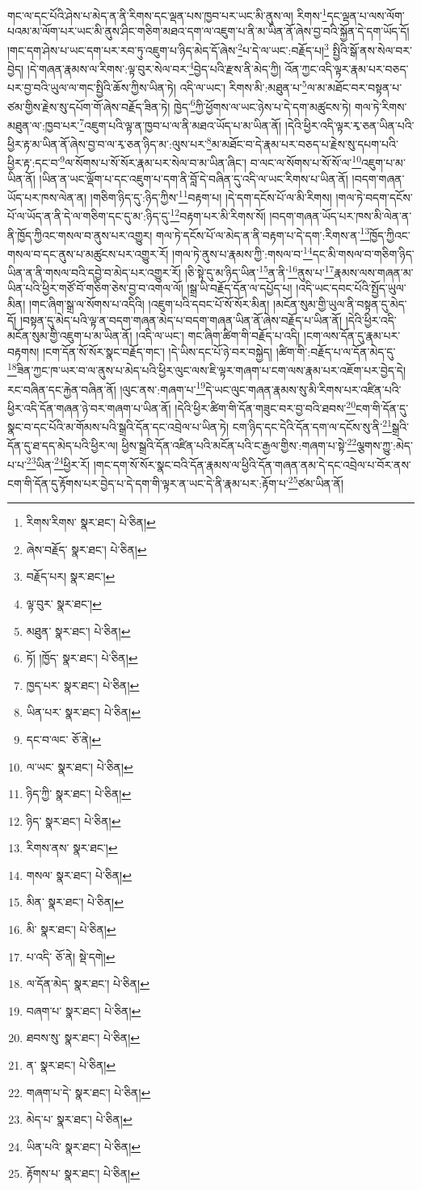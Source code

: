 གང་ལ་དང་པོའི་ཤེས་པ་མེད་ན་ནི་རིགས་དང་ལྡན་པས་ཁྱབ་པར་ཡང་མི་ནུས་ལ། རིགས་\footnote{རིགས་རིགས་  སྣར་ཐང་།  པེ་ཅིན། }དང་ལྡན་པ་ལས་ལོག་པའམ་མ་ལོག་པར་ཡང་མི་ནུས་ཤིང་གཅིག་མཐའ་དག་ལ་འཇུག་པ་ནི་མ་ཡིན་ནོ་ཞེས་བྱ་བའི་སྐྱོན་དེ་དག་ཡོད་དོ། །གང་དག་ཤེས་པ་ཡང་དག་པར་རབ་ཏུ་འཇུག་པ་ཉིད་མེད་དོ་ཞེས་\footnote{ཞེས་བརྗོད་  སྣར་ཐང་།  པེ་ཅིན། }པ་དེ་ལ་ཡང་:བརྗོད་པ།\footnote{བརྗོད་པར།  སྣར་ཐང་། } སྤྱིའི་སྒོ་ནས་སེལ་བར་བྱེད། །དེ་གཞན་རྣམས་ལ་རིགས་:ལྟ་བུར་སེལ་བར་\footnote{ལྟ་བུར་  སྣར་ཐང་། }བྱེད་པའི་རྫས་ནི་མེད་ཀྱི། འོན་ཀྱང་འདི་ལྟར་རྣམ་པར་བཅད་པར་བྱ་བའི་ཡུལ་ལ་གང་སྤྱིའི་ཆོས་ཀྱིས་ཡིན་ཏེ། འདི་ལ་ཡང་། རིགས་མི་:མཐུན་པ་\footnote{མཐུན་  སྣར་ཐང་།  པེ་ཅིན། }ལ་མ་མཐོང་བར་བསྟན་པ་ཙམ་གྱིས་རྗེས་སུ་དཔོག་གོ་ཞེས་བརྗོད་ཟིན་ཏེ། ཁྱེད་\footnote{ཏོ། །ཁྱོད་  སྣར་ཐང་།  པེ་ཅིན། }ཀྱི་ཕྱོགས་ལ་ཡང་ཉེས་པ་དེ་དག་མཚུངས་ཏེ། གལ་ཏེ་རིགས་མཐུན་ལ་:ཁྱབ་པར་\footnote{ཁྱད་པར་  སྣར་ཐང་།  པེ་ཅིན། }འཇུག་པའི་ལྟ་ན་ཁྱབ་པ་ལ་ནི་མཐའ་ཡོད་པ་མ་ཡིན་ནོ། །དེའི་ཕྱིར་འདི་ལྟར་རྭ་ཅན་ཡིན་པའི་ཕྱིར་རྟ་མ་ཡིན་ནོ་ཞེས་བྱ་བ་ལ་རྭ་ཅན་ཉིད་མ་:ལུས་པར་\footnote{ཡིན་པར་  སྣར་ཐང་།  པེ་ཅིན། }མ་མཐོང་བ་དེ་རྣམ་པར་བཅད་པ་རྗེས་སུ་དཔག་པའི་ཕྱིར་རྟ་:དང་བ་\footnote{དང་བ་ལང་  ཅོ་ནེ། }ལ་སོགས་པ་སོ་སོར་རྣམ་པར་སེལ་བ་མ་ཡིན་ཞིང་། བ་ལང་ལ་སོགས་པ་སོ་སོ་ལ་\footnote{ལ་ཡང་  སྣར་ཐང་།  པེ་ཅིན། }འཇུག་པ་མ་ཡིན་ནོ། །ཡིན་ན་ཡང་ལྡོག་པ་དང་འཇུག་པ་དག་ནི་བློ་དེ་བཞིན་དུ་འདི་ལ་ཡང་རིགས་པ་ཡིན་ནོ། །བདག་གཞན་ཡོད་པར་ཁས་ལེན་ན། །གཅིག་ཉིད་དུ་:ཉིད་ཀྱིས་\footnote{ཉིད་ཀྱི་  སྣར་ཐང་།  པེ་ཅིན། }བརྟག་པ། །དེ་དག་དངོས་པོ་ལ་མི་རིགས། །གལ་ཏེ་བདག་དངོས་པོ་ལ་ཡོད་ན་ནི་དེ་ལ་གཅིག་དང་དུ་མ་:ཉིད་དུ་\footnote{ཉིད་  སྣར་ཐང་།  པེ་ཅིན། }བརྟག་པར་མི་རིགས་སོ། །བདག་གཞན་ཡོད་པར་ཁས་མི་ལེན་ན་ནི་ཁྱོད་ཀྱིའང་གསལ་བ་ནུས་པར་འགྱུར། གལ་ཏེ་དངོས་པོ་ལ་མེད་ན་ནི་བརྟག་པ་དེ་དག་:རིགས་ན་\footnote{རིགས་ནས་  སྣར་ཐང་། }ཁྱོད་ཀྱིའང་གསལ་བ་དང་ནུས་པ་མཚུངས་པར་འགྱུར་རོ། །གལ་ཏེ་ནུས་པ་རྣམས་ཀྱི་:གསལ་བ་\footnote{གསལ་  སྣར་ཐང་།  པེ་ཅིན། }དང་མི་གསལ་བ་གཅིག་ཉིད་ཡིན་ན་ནི་གསལ་བའི་དབྱེ་བ་མེད་པར་འགྱུར་རོ། །ཅི་སྟེ་དུ་མ་ཉིད་ཡིན་\footnote{མིན་  སྣར་ཐང་།  པེ་ཅིན། }ན་ནི་\footnote{མི་  སྣར་ཐང་།  པེ་ཅིན། }ནུས་པ་\footnote{པ་འདི་  ཅོ་ནེ།  སྡེ་དགེ། }རྣམས་ལས་གཞན་མ་ཡིན་པའི་ཕྱིར་གཙོ་བོ་གཅིག་ཅེས་བྱ་བ་འགལ་ལོ། །སྒྲ་ཡི་བརྗོད་དོན་ལ་དཔྱོད་པ། །འདི་ཡང་དབང་པོའི་སྤྱོད་ཡུལ་མིན། །གང་ཞིག་སྒྲ་ལ་སོགས་པ་འདིའི། །འཇུག་པའི་དབང་པོ་སོ་སོར་མིན། །མངོན་སུམ་གྱི་ཡུལ་ནི་བསྟན་དུ་མེད་དོ། །བསྟན་དུ་མེད་པའི་ལྟ་ན་བདག་གཞན་མེད་པ་བདག་གཞན་ཡིན་ནོ་ཞེས་བརྗོད་པ་ཡིན་ནོ། །དེའི་ཕྱིར་འདི་མངོན་སུམ་གྱི་འཇུག་པ་མ་ཡིན་ནོ། །འདི་ལ་ཡང་། གང་ཞིག་ཚིག་གི་བརྗོད་པ་འདི། །ངག་ལས་དོན་དུ་རྣམ་པར་བརྟགས། །ངག་དོན་སོ་སོར་སྣང་བརྗོད་གང་། །དེ་ཡིས་དང་པོ་ཉེ་བར་བསྐྱེད། །ཚིག་གི་:བརྗོད་པ་ལ་དོན་མེད་དུ་\footnote{ལ་དོན་མེད་  སྣར་ཐང་།  པེ་ཅིན། }ཟིན་ཀྱང་ཁ་ཡར་བ་ལ་ནུས་པ་མེད་པའི་ཕྱིར་ལུང་ལས་ཇི་ལྟར་གཞག་པ་ངག་ལས་རྣམ་པར་འཇོག་པར་བྱེད་དེ། རང་བཞིན་དང་རྐྱེན་བཞིན་ནོ། །ལུང་ནས་:གཞག་པ་\footnote{བཞག་པ་  སྣར་ཐང་།  པེ་ཅིན། }དེ་ཡང་ལུང་གཞན་རྣམས་སུ་མི་རིགས་པར་འཛིན་པའི་ཕྱིར་འདི་དོན་གཞན་ཉེ་བར་གཞག་པ་ཡིན་ནོ། །དེའི་ཕྱིར་ཚིག་གི་དོན་གཟུང་བར་བྱ་བའི་ཐབས་\footnote{ཐབས་སུ་  སྣར་ཐང་།  པེ་ཅིན། }ངག་གི་དོན་དུ་སྣང་བ་དང་པོའི་མ་གོམས་པའི་སྒྲའི་དོན་དང་འབྲེལ་པ་ཡིན་ཏེ། ངག་ཉིད་དང་དེའི་དོན་དག་ལ་དངོས་སུ་ནི་\footnote{ན་  སྣར་ཐང་།  པེ་ཅིན། }སྒྲའི་དོན་དུ་ཐ་དད་མེད་པའི་ཕྱིར་ལ། ཕྱིས་སྒྲའི་དོན་འཛིན་པའི་མངོན་པའི་ང་རྒྱལ་གྱིས་:གཞག་པ་སྟེ་\footnote{གཞག་པ་དེ་  སྣར་ཐང་།  པེ་ཅིན། }ལྕགས་ཀྱུ་:མེད་པ་པ་\footnote{མེད་པ་  སྣར་ཐང་།  པེ་ཅིན། }ཡིན་\footnote{ཡིན་པའི་  སྣར་ཐང་།  པེ་ཅིན། }ཕྱིར་རོ། །གང་དག་སོ་སོར་སྣང་བའི་དོན་རྣམས་ལ་ཕྱིའི་དོན་གཞན་ནམ་དེ་དང་འབྲེལ་པ་བོར་ནས་ངག་གི་དོན་དུ་རྟོགས་པར་བྱེད་པ་དེ་དག་གི་ལྟར་ན་ཡང་དེ་ནི་རྣམ་པར་:རྟོག་པ་\footnote{རྟོགས་པ་  སྣར་ཐང་།  པེ་ཅིན། }ཙམ་ཡིན་ནོ། 